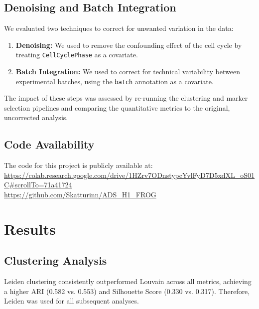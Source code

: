 \documentclass[12pt,letterpaper]{article}
\begin{document}
\subsection{Denoising and Batch Integration}
We evaluated two techniques to correct for unwanted variation in the data:
\begin{enumerate}
    \item \textbf{Denoising:} We used  to remove the confounding effect of the cell cycle by treating \verb|CellCyclePhase| as a covariate.
    \item \textbf{Batch Integration:} We used  to correct for technical variability between experimental batches, using the \texttt{batch} annotation as a covariate.
\end{enumerate}
The impact of these steps was assessed by re-running the clustering and marker selection pipelines and comparing the quantitative metrics to the original, uncorrected analysis.

\subsection{Code Availability}
The code for this project is publicly available at: \\
\url{https://colab.research.google.com/drive/1HZrv7ODnstypcYvlFyD7D5xdXL_oS01C#scrollTo=71a41724}\\
\url{https://github.com/Skatturinn/ADS_H1_FROG}

\section{Results}
\subsection{Clustering Analysis}
Leiden clustering consistently outperformed Louvain across all metrics, achieving a higher ARI (0.582 vs. 0.553) and Silhouette Score (0.330 vs. 0.317). Therefore, Leiden was used for all subsequent analyses.
\end{document}
